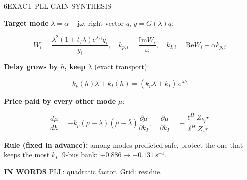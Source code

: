 \begin{minipage}[t][\PosterRowHeight][t]{\PosterColWidth}\vspace{0pt}
  \begin{PosterPanel}{\PosterRowHeight}{6}{EXACT PLL GAIN SYNTHESIS}

    {\FigureSize \textbf{Target mode} $\lambda=\alpha+\mathrm{j}\omega$, right vector $q$, $y=G(\lambda)q$:\par}
    {\fontsize{25pt}{30pt}\selectfont\color{IASBlue}\[
      W_i=\frac{\lambda^{2}(1+t_f\lambda)e^{\lambda\tau_i}q_i}{y_i},\quad
      k_{p,i}=\frac{\mathrm{Im}W_i}{\omega},\quad
      k_{I,i}=\mathrm{Re}W_i-\alpha k_{p,i}
    \]}\par\vspace{1mm}
    \vspace{-4mm}
    {\FigureSize \textbf{Delay grows by $h$, keep $\lambda$} (exact transport):\par}
    {\fontsize{29pt}{34pt}\selectfont\color{IASBlue}\[
      \boxed{k_p(h)\lambda+k_I(h)=(k_p\lambda+k_I)\,e^{\lambda h}}
    \]}\par\vspace{1mm}
    \vspace{-4mm}
    {\FigureSize \textbf{Price paid by every other mode} $\mu$:\par}
    {\fontsize{27pt}{32pt}\selectfont\color{IASBlue}\[
      \frac{d\mu}{dh}=-k_p(\mu-\lambda)(\mu-\bar\lambda)\frac{\partial\mu}{\partial k_I},\quad
      \frac{\partial\mu}{\partial k_I}=-\frac{\ell^{H}Z_{k_I}r}{\ell^{H}Z_{s}r}
    \]}\par\vspace{1mm}
    \vspace{-4mm}
    {\fontsize{22pt}{25pt}\selectfont \textbf{Rule (fixed in advance):} among modes predicted safe, protect the one that keeps the most $k_I$. 9-bus bank: $+0.886\to-0.131\ \mathrm{s^{-1}}$.\par}
    \vspace{1mm}
    \begin{tcolorbox}[colback=IASPaleGold,colframe=IASGold,boxrule=0.8pt,arc=1.5mm,left=2mm,right=2mm,top=1mm,bottom=1mm]
      {\fontsize{22pt}{25pt}\selectfont\textbf{IN WORDS} PLL: quadratic factor. Grid: residue.\par}
    \end{tcolorbox}

  \end{PosterPanel}
\end{minipage}%
